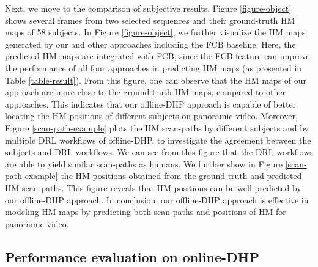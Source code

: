 \documentclass[10pt,journal,compsoc]{IEEEtran}
\begin{document}
Next, we move to the comparison of subjective results. Figure \ref{figure-object} shows several frames from two selected sequences and their ground-truth HM maps of 58 subjects.
In Figure \ref{figure-object}, we further visualize the HM maps generated by our and other approaches including the FCB baseline. Here, the predicted HM maps are integrated with FCB, since the FCB feature can improve the performance of all four approaches in predicting HM maps (as presented in Table \ref{table-result}).
From this figure, one can observe that the HM maps of our approach are more close to the ground-truth HM maps, compared to other approaches.
This indicates that our offline-DHP approach is capable of better locating the HM positions of different subjects on panoramic video.
Moreover, Figure \ref{scan-path-example} plots the HM scan-paths by different subjects and by multiple DRL workflows of offline-DHP, to investigate the agreement between the subjects and DRL workflows.
We can see from this figure that the DRL workflows are able to yield similar scan-paths as humans.  We further show in Figure \ref{scan-path-example} the HM positions obtained from the ground-truth and predicted HM scan-paths. This figure reveals that HM positions can be well predicted by our offline-DHP approach. In conclusion, our offline-DHP approach is effective in modeling HM maps by predicting both scan-paths and positions of HM for panoramic video.



\subsection{Performance evaluation on online-DHP}\label{sec:evaluation_online}
\label{online-compare}

\end{document}

